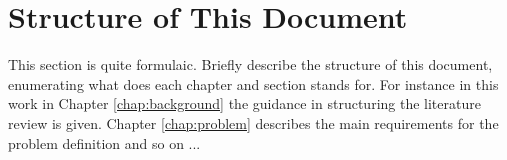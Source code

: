 \section{Structure of This Document}
This section is quite formulaic. Briefly describe the structure of this document, enumerating what does each chapter and section stands for. For instance in this work in Chapter \ref{chap:background} the guidance in structuring the literature review is given. Chapter \ref{chap:problem} describes the main requirements for the problem definition and so on ...
